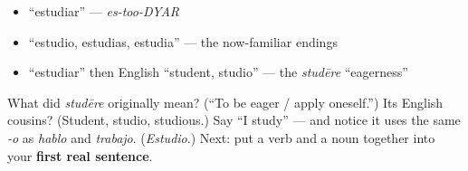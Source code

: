 \begin{itemize}
\raggedright
  \item \textquotedblleft{}estudiar\textquotedblright{} — \emph{es-too-DYAR}
  \item \textquotedblleft{}estudio, estudias, estudia\textquotedblright{} — the now-familiar endings
  \item \textquotedblleft{}estudiar\textquotedblright{} then English \textquotedblleft{}student, studio\textquotedblright{} — the \emph{studēre} \textquotedblleft{}eagerness\textquotedblright{}
\end{itemize}

\begin{tcolorbox}[breakable,colback=teal!4,colframe=teal!35!black,title={Before you move on}]
What did \emph{studēre} originally mean? (\textquotedblleft{}To be eager / apply oneself.\textquotedblright{}) Its English cousins? (Student, studio, studious.) Say \textquotedblleft{}I study\textquotedblright{} — and notice it uses the same \emph{-o} as \emph{hablo} and \emph{trabajo}. (\emph{Estudio}.) Next: put a verb and a noun together into your \textbf{first real sentence}.
\end{tcolorbox}
